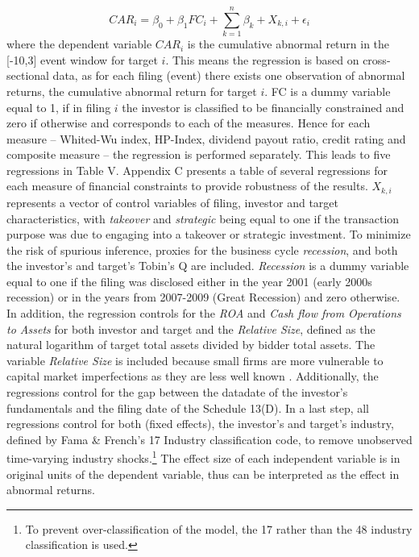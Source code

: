 \documentclass[12pt]{article}
\begin{document}
\begin{equation}
	CAR_{i}=\beta_{0}+\beta_{1}FC_{i}+\sum_{k=1}^{n}\beta_{k}+X_{k,i}+\epsilon_{i}
\end{equation}
where the dependent variable $CAR_{i}$ is the cumulative abnormal return in the [-10,3] event window for target $i$. This means the regression is based on cross-sectional data, as for each filing (event) there exists one observation of abnormal returns, the cumulative abnormal return for target $i$. FC is a dummy variable equal to 1, if in filing $i$ the investor is classified to be financially constrained and zero if otherwise and corresponds to each of the measures. Hence for each measure -- Whited-Wu index, HP-Index, dividend payout ratio, credit rating and composite measure -- the regression is performed separately. This leads to five regressions in Table V. Appendix C presents a table of several regressions for each measure of financial constraints to provide robustness of the results. $X_{k,i}$ represents a vector of control variables of filing, investor and target characteristics, with \emph{takeover} and \emph{strategic} being equal to one if the transaction purpose was due to engaging into a takeover or strategic investment. To minimize the risk of spurious inference, proxies for the business cycle \emph{recession}, and both the investor's and target's Tobin's Q are included. \emph{Recession} is a dummy variable equal to one if the filing was disclosed either in the year 2001 (early 2000s recession) or in the years from 2007-2009 (Great Recession) and zero otherwise. In addition, the regression controls for the \emph{ROA} and \emph{Cash flow from Operations to Assets} for both investor and target and the \emph{Relative Size}, defined as the natural logarithm of target total assets divided by bidder total assets. The variable \emph{Relative Size} is included because small firms are more vulnerable to capital market imperfections  as they are less well known \citep[p.2004]{Almeida2004}. Additionally, the regressions control for the gap between the datadate of the investor's fundamentals and the filing date of the Schedule 13(D). In a last step, all regressions control for both (fixed effects), the investor's and target's industry, defined by Fama \& French's 17 Industry classification code, to remove unobserved time-varying industry shocks.\footnote{To prevent over-classification of the model, the 17 rather than the 48 industry classification is used.} The effect size of each independent variable is in original units of the dependent variable, thus can be interpreted as the effect in abnormal returns.\par
\end{document}

